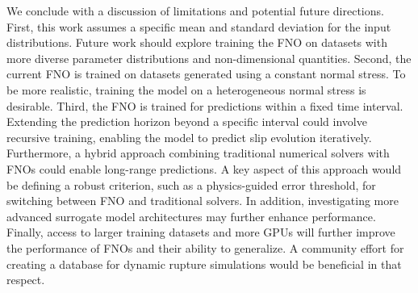 \documentclass[draft]{agujournal2019}
\begin{document}
We conclude with a discussion of limitations and potential future directions. First, this work assumes a specific mean and standard deviation for the input distributions. Future work should explore training the FNO on datasets with more diverse parameter distributions and non-dimensional quantities. Second, the current FNO is trained on datasets generated using a constant normal stress. To be more realistic, training the model on a heterogeneous normal stress is desirable. Third, the FNO is trained for predictions within a fixed time interval. Extending the prediction horizon beyond a specific interval could involve recursive training, enabling the model to predict slip evolution iteratively. Furthermore, a hybrid approach combining traditional numerical solvers with FNOs could enable long-range predictions. A key aspect of this approach would be defining a robust criterion, such as a physics-guided error threshold, for switching between FNO and traditional solvers. In addition, investigating more advanced surrogate model architectures may further enhance performance. Finally, access to larger training datasets and more GPUs will further improve the performance of FNOs and their ability to generalize. A community effort for creating a database for dynamic rupture simulations would be beneficial in that respect. 





%
%
\end{document}
